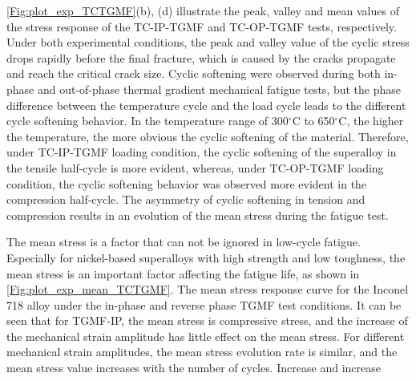 \ref{Fig:plot_exp_TCTGMF}(b), (d) illustrate the peak, valley and mean values of the stress response of the TC-IP-TGMF and TC-OP-TGMF tests, respectively.
Under both experimental conditions, the peak and valley value of the cyclic stress drops rapidly before the final fracture, which is caused by the cracks propagate and reach the critical crack size.
Cyclic softening were observed during both in-phase and out-of-phase thermal gradient mechanical fatigue tests, but the phase difference between the temperature cycle and the load cycle leads to the different cycle softening behavior. In the temperature range of 300$^\circ$C to 650$^\circ$C, the higher the temperature, the more obvious the cyclic softening of the material. Therefore, under TC-IP-TGMF loading condition, the cyclic softening of the superalloy in the tensile half-cycle is more evident, whereas, under TC-OP-TGMF loading condition, the cyclic softening behavior was observed more evident in the compression half-cycle. The asymmetry of cyclic softening in tension and compression results in an evolution of the mean stress during the fatigue test.

The mean stress is a factor that can not be ignored in low-cycle fatigue. Especially for nickel-based superalloys with high strength and low toughness, the mean stress is an important factor affecting the fatigue life, as shown in \ref{Fig:plot_exp_mean_TCTGMF}. The mean stress response curve for the Inconel 718 alloy under the in-phase and reverse phase TGMF test conditions. It can be seen that for TGMF-IP, the mean stress is compressive stress, and the increase of the mechanical strain amplitude has little effect on the mean stress. For different mechanical strain amplitudes, the mean stress evolution rate is similar, and the mean stress value increases with the number of cycles. Increase and increase


